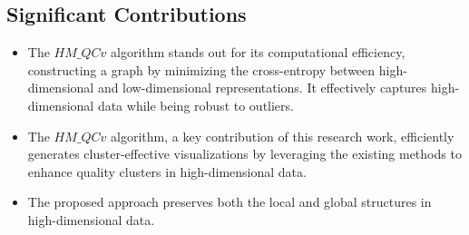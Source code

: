 \subsection{Significant Contributions}
\begin{itemize}
    \item The $HM\_QCv$ algorithm stands out for its computational efficiency, constructing a graph by minimizing the cross-entropy between high-dimensional and low-dimensional representations. It effectively captures high-dimensional data while being robust to outliers.
    \item The $HM\_QCv$ algorithm, a key contribution of this research work, efficiently generates cluster-effective visualizations by leveraging the existing methods to enhance quality clusters in high-dimensional data.
    \item The proposed approach preserves both the local and global structures in high-dimensional data.
\end{itemize}










